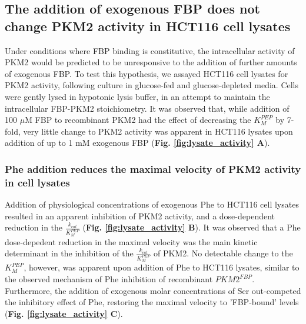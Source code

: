 \subsection{The addition of exogenous FBP does not change PKM2 activity in HCT116 cell lysates}
\label{subsec:cell_lysate_act_fbp}
Under conditions where FBP binding is constitutive, the intracellular activity of PKM2 would be predicted to be unresponsive to the addition of further amounts of exogenous FBP. To test this hypothesis, we assayed HCT116 cell lysates for PKM2 activity, following culture in glucose-fed and glucose-depleted media. Cells were gently lysed in hypotonic lysis buffer, in an attempt to maintain the intracellular FBP-PKM2 stoichiometry. It was observed that, while addition of 100 $\mu$M FBP to recombinant PKM2 had the effect of decreasing the $K_{M}^{PEP}$ by 7-fold, very little change to PKM2 activity was apparent in HCT116 lysates upon addition of up to 1 mM exogenous FBP (\textbf{Fig. \ref{fig:lysate_activity} A}). 

\subsubsection{Phe addition reduces the maximal velocity of PKM2 activity in cell lysates}
Addition of physiological concentrations of exogenous Phe to HCT116 cell lysates resulted in an apparent inhibition of PKM2 activity, and a dose-dependent reduction in the $\frac{k_{cat}}{K_{M}^{PEP}}$ (\textbf{Fig. \ref{fig:lysate_activity} B}). It was observed that a Phe dose-depedent reduction in the maximal velocity was the main kinetic determinant in the inhibition of the $\frac{k_{cat}}{K_{M}^{PEP}}$ of PKM2. No detectable change to the ${K_{M}^{PEP}}$, however, was apparent upon addition of Phe to HCT116 lysates, similar to the observed mechanism of Phe inhibition of recombinant $PKM2^{FBP}$. Furthermore, the addition of exogenous molar concentrations of Ser out-competed the inhibitory effect of Phe, restoring the maximal velocity to 'FBP-bound' levels (\textbf{Fig. \ref{fig:lysate_activity} C}). 

